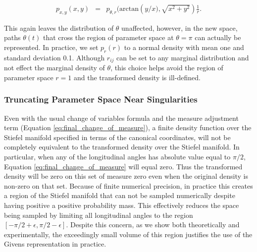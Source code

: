\documentclass[ba]{imsart}
\numberwithin{equation}{section}
\theoremstyle{plain}
\begin{document}
\begin{eqnarray}
p_{x, y}(x,y) &=& p_{\theta, r}(\mathrm{arctan} \left(y/x), \sqrt{x^2 + y^2} \right) \frac{1}{r}.
\end{eqnarray}

\noindent This again leaves the distribution of $\theta$ unaffected, however, in the new space, paths $\theta(t)$ that cross the region of parameter space at $\theta = \pi$ can actually be represented. In practice, we set  $p_r(r)$ to a normal density with mean one and standard deviation 0.1. Although $r_{ij}$ can be set to any marginal distribution and not effect the marginal density of $\theta$, this choice helps avoid the region of parameter space $r = 1$ and the transformed density is ill-defined.

\subsubsection{Truncating Parameter Space Near Singularities}
\noindent  Even with the usual change of variables formula and the measure adjustment term (Equation \ref{eq:final_change_of_measure}), a finite density function over the Stiefel manifold specified in terms of the canonical coordinates, will not be completely equivalent to the transformed density over the Stiefel manifold. In particular, when any of the longitudinal angles has absolute value equal to $\pi/2$, Equation \ref{eq:final_change_of_measure} will equal zero. Thus the transformed density will be zero on this set of measure zero even when the original density is non-zero on that set. Because of finite numerical precision, in practice this creates a region of the Stiefel manifold that can not be sampled numerically despite having positive a positive probability mass. This effectively reduces the space being sampled by limiting all longitudinal angles to the region $[-\pi/2 + \epsilon, \pi/2 - \epsilon]$. Despite this concern, as we show both theoretically and experimentally, the exceedingly small volume of this region justifies the use of the Givens representation in practice.



\end{document}

